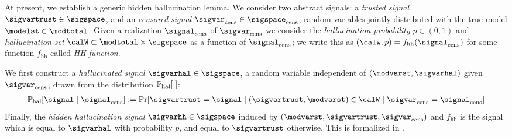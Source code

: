 \newcommand{\hhdrawvar}{\boldsf{Draw}_{\mathrm{hh}}}

\newcommand{\Dhh}{\mathcal{D}_{\mathrm{hh}}}

\newcommand{\DelZ}{\Delta_{\mathcal{Z}}}
\newcommand{\boldcalW}{\bm{\mathcal{W}}}
\newcommand{\sigvarcens}{\sigvar_{\mathrm{cens}}}
\newcommand{\sigcens}{\signal_{\mathrm{cens}}}
\newcommand{\sigspacecens}{\sigspace_{\mathrm{cens}}}

\newcommand{\fhh}{f_{\mathrm{hh}}}

\newcommand{\Subsets}{\mathrm{Subsets}}

At present, we establish a generic hidden hallucination lemma. We consider two abstract signals: a \emph{trusted signal} $\sigvartrust \in \sigspace$, and an \emph{censored signal} $\sigvarcens \in \sigspacecens$, random variables jointly distributed with the true model $\modelst \in \modtotal$. Given a realization $\sigcens$ of $\sigvarcens$ we consider the \emph{hallucination probability} $p\in(0,1)$ and \emph{hallucination set} $\calW\subset \modtotal \times \sigspace$
as a function of $\sigcens$; we write this 
as  $(\calW,p)  =\fhh(\sigcens)$ for some 
function $\fhh$ called \emph{HH-function}. 




 We first construct a \emph{hallucinated signal} $\sigvarhal \in \sigspace$, a random variable independent of $(\modvarst,\sigvarhal)$ given $\sigvarcens$,  drawn from the distribution $\mathbb{P}_{\mathrm{hal}}[\cdot]$:
\begin{align}
\Prhal[ \signal \mid \sigcens] := \Pr[\sigvartrust = \signal \mid (\sigvartrust,\modvarst) \in \calW\mid\sigvarcens = \sigcens] \label{eq:Prhal}
\end{align}
Finally, the \emph{hidden hallucination signal}  $\sigvarhh \in \sigspace$ induced by $(\modvarst,\sigvartrust,\sigvarcens)$ and $\fhh$ is the signal  which is equal to $\sigvarhal$ with probability $p$, and equal to $\sigvartrust$ otherwise. This is formalized in .
\newcommand{\sighh}{\signal_{\mathrm{hh}}}
\newcommand{\sighal}{\signal_{\mathrm{hal}}}
\newcommand{\histcens}{\hist^{\censkind}}


